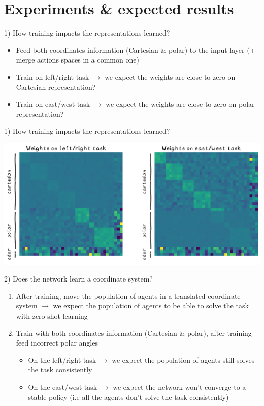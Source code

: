 \documentclass[bigger]{beamer}
\begin{document}
\section{Experiments \& expected results  }
\label{sec:org30d62a7}
\begin{frame}[<+->][label={sec:orgc382da5}]{1) How training impacts the representations learned?}
\begin{itemize}
\item Feed both coordinates information (Cartesian \& polar) to the input layer (+ merge actions spaces in a common one)
\item Train on left/right task \(\to\) we expect the weights are close to zero on Cartesian representation?
\item Train on east/west task \(\to\) we expect the weights are close to zero on polar representation?
\end{itemize}
\end{frame}
\begin{frame}[label={sec:org1a34467}]{1) How training impacts the representations learned?}
\begin{center}
\includegraphics[width=.9\linewidth]{img/exp1-weights-heatmap.png}
\end{center}
\end{frame}
\begin{frame}[<+->][label={sec:orgfd15c54}]{2) Does the network learn a coordinate system?}
\begin{enumerate}
\item After training, move the population of agents in a translated coordinate system
\(\to\) we expect the population of agents to be able to solve the task with zero shot learning
\item Train with both coordinates information (Cartesian \& polar), after training feed incorrect polar angles
\begin{itemize}
\item On the left/right task \(\to\) we expect the population of agents still solves the task consistently
\item On the east/west task \(\to\) we expect the network won't converge to a stable policy (i.e all the agents don't solve the task consistently)
\end{itemize}
\end{enumerate}
\end{frame}
\end{document}

